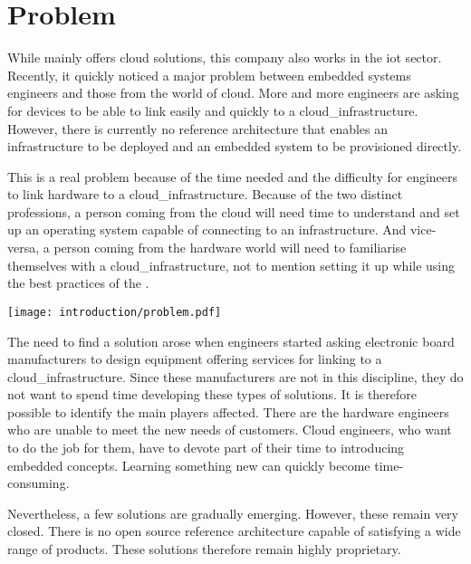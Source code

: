 \section{Problem}

While  mainly offers \gls{cloud} solutions, this company also works in the \acrfull{iot} sector. Recently, it quickly noticed a major problem between embedded systems engineers and those from the world of \gls{cloud}. More and more engineers are asking for devices to be able to link easily and quickly to a \gls{cloud_infrastructure}. However, there is currently no reference architecture that enables an infrastructure to be deployed and an embedded system to be provisioned directly.

This is a real problem because of the time needed and the difficulty for engineers to link hardware to a \gls{cloud_infrastructure}. Because of the two distinct professions, a person coming from the \gls{cloud} will need time to understand and set up an operating system capable of connecting to an infrastructure. And vice-versa, a person coming from the hardware world will need to familiarise themselves with a \gls{cloud_infrastructure}, not to mention setting it up while using the best practices of the .
\begin{center}
    \begingroup
    \texttt{[image: introduction/problem.pdf]}
    \label{fig:enterprise_logo}
    \endgroup
\end{center}
The need to find a solution arose when engineers started asking electronic board manufacturers to design equipment offering services for linking to a \gls{cloud_infrastructure}. Since these manufacturers are not in this discipline, they do not want to spend time developing these types of solutions. It is therefore possible to identify the main players affected. There are the hardware engineers who are unable to meet the new needs of customers. Cloud engineers, who want to do the job for them, have to devote part of their time to introducing embedded concepts. Learning something new can quickly become time-consuming.

Nevertheless, a few solutions are gradually emerging. However, these remain very closed. There is no open source reference architecture capable of satisfying a wide range of products. These solutions therefore remain highly proprietary.


